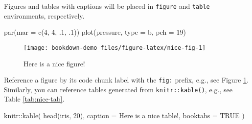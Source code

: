 \documentclass[
]{book}
\newenvironment{Shaded}{\begin{snugshade}}{\end{snugshade}}
\newcommand{\AttributeTok}[1]{\textcolor[rgb]{0.77,0.63,0.00}{#1}}
\newcommand{\ConstantTok}[1]{\textcolor[rgb]{0.00,0.00,0.00}{#1}}
\newcommand{\DecValTok}[1]{\textcolor[rgb]{0.00,0.00,0.81}{#1}}
\newcommand{\FunctionTok}[1]{\textcolor[rgb]{0.00,0.00,0.00}{#1}}
\newcommand{\NormalTok}[1]{#1}
\newcommand{\SpecialCharTok}[1]{\textcolor[rgb]{0.00,0.00,0.00}{#1}}
\newcommand{\StringTok}[1]{\textcolor[rgb]{0.31,0.60,0.02}{#1}}
\begin{document}
Figures and tables with captions will be placed in \texttt{figure} and \texttt{table} environments, respectively.

\begin{Shaded}
\begin{Highlighting}[]
\FunctionTok{par}\NormalTok{(}\AttributeTok{mar =} \FunctionTok{c}\NormalTok{(}\DecValTok{4}\NormalTok{, }\DecValTok{4}\NormalTok{, .}\DecValTok{1}\NormalTok{, .}\DecValTok{1}\NormalTok{))}
\FunctionTok{plot}\NormalTok{(pressure, }\AttributeTok{type =} \StringTok{\textquotesingle{}b\textquotesingle{}}\NormalTok{, }\AttributeTok{pch =} \DecValTok{19}\NormalTok{)}
\end{Highlighting}
\end{Shaded}

\begin{figure}

{\centering \texttt{[image: bookdown-demo\_files/figure-latex/nice-fig-1]} 

}

\caption{Here is a nice figure!}\label{fig:nice-fig}
\end{figure}

Reference a figure by its code chunk label with the \texttt{fig:} prefix, e.g., see Figure \ref{fig:nice-fig}. Similarly, you can reference tables generated from \texttt{knitr::kable()}, e.g., see Table \ref{tab:nice-tab}.

\begin{Shaded}
\begin{Highlighting}[]
\NormalTok{knitr}\SpecialCharTok{::}\FunctionTok{kable}\NormalTok{(}
  \FunctionTok{head}\NormalTok{(iris, }\DecValTok{20}\NormalTok{), }\AttributeTok{caption =} \StringTok{\textquotesingle{}Here is a nice table!\textquotesingle{}}\NormalTok{,}
  \AttributeTok{booktabs =} \ConstantTok{TRUE}
\NormalTok{)}
\end{Highlighting}
\end{Shaded}
\end{document}
